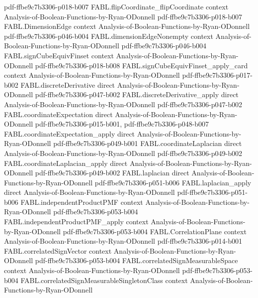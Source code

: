 \begin{theorem}
  {pdf-ffbe9c7b3306-p018-b007}
\proofstep
  {FABL.flipCoordinate_flipCoordinate}
  {context}
  {Analysis-of-Boolean-Functions-by-Ryan-ODonnell}
  {pdf-ffbe9c7b3306-p018-b007}
\proofstep
  {FABL.DimensionEdge}
  {context}
  {Analysis-of-Boolean-Functions-by-Ryan-ODonnell}
  {pdf-ffbe9c7b3306-p046-b004}
\proofstep
  {FABL.dimensionEdgeNonempty}
  {context}
  {Analysis-of-Boolean-Functions-by-Ryan-ODonnell}
  {pdf-ffbe9c7b3306-p046-b004}
\proofstep
  {FABL.signCubeEquivFinset}
  {context}
  {Analysis-of-Boolean-Functions-by-Ryan-ODonnell}
  {pdf-ffbe9c7b3306-p018-b008}
\proofstep
  {FABL.signCubeEquivFinset_apply_card}
  {context}
  {Analysis-of-Boolean-Functions-by-Ryan-ODonnell}
  {pdf-ffbe9c7b3306-p017-b002}
\proofstep
  {FABL.discreteDerivative}
  {direct}
  {Analysis-of-Boolean-Functions-by-Ryan-ODonnell}
  {pdf-ffbe9c7b3306-p047-b002}
\proofstep
  {FABL.discreteDerivative_apply}
  {direct}
  {Analysis-of-Boolean-Functions-by-Ryan-ODonnell}
  {pdf-ffbe9c7b3306-p047-b002}
\proofstep
  {FABL.coordinateExpectation}
  {direct}
  {Analysis-of-Boolean-Functions-by-Ryan-ODonnell}
  {pdf-ffbe9c7b3306-p015-b001,
    pdf-ffbe9c7b3306-p048-b007}
\proofstep
  {FABL.coordinateExpectation_apply}
  {direct}
  {Analysis-of-Boolean-Functions-by-Ryan-ODonnell}
  {pdf-ffbe9c7b3306-p049-b001}
\proofstep
  {FABL.coordinateLaplacian}
  {direct}
  {Analysis-of-Boolean-Functions-by-Ryan-ODonnell}
  {pdf-ffbe9c7b3306-p049-b002}
\proofstep
  {FABL.coordinateLaplacian_apply}
  {direct}
  {Analysis-of-Boolean-Functions-by-Ryan-ODonnell}
  {pdf-ffbe9c7b3306-p049-b002}
\proofstep
  {FABL.laplacian}
  {direct}
  {Analysis-of-Boolean-Functions-by-Ryan-ODonnell}
  {pdf-ffbe9c7b3306-p051-b006}
\proofstep
  {FABL.laplacian_apply}
  {direct}
  {Analysis-of-Boolean-Functions-by-Ryan-ODonnell}
  {pdf-ffbe9c7b3306-p051-b006}
\proofstep
  {FABL.independentProductPMF}
  {context}
  {Analysis-of-Boolean-Functions-by-Ryan-ODonnell}
  {pdf-ffbe9c7b3306-p053-b004}
\proofstep
  {FABL.independentProductPMF_apply}
  {context}
  {Analysis-of-Boolean-Functions-by-Ryan-ODonnell}
  {pdf-ffbe9c7b3306-p053-b004}
\proofstep
  {FABL.CorrelationPlane}
  {context}
  {Analysis-of-Boolean-Functions-by-Ryan-ODonnell}
  {pdf-ffbe9c7b3306-p014-b001}
\proofstep
  {FABL.correlatedSignVector}
  {context}
  {Analysis-of-Boolean-Functions-by-Ryan-ODonnell}
  {pdf-ffbe9c7b3306-p053-b004}
\proofstep
  {FABL.correlatedSignMeasurableSpace}
  {context}
  {Analysis-of-Boolean-Functions-by-Ryan-ODonnell}
  {pdf-ffbe9c7b3306-p053-b004}
\proofstep
  {FABL.correlatedSignMeasurableSingletonClass}
  {context}
  {Analysis-of-Boolean-Functions-by-Ryan-ODonnell}

\end{theorem}
